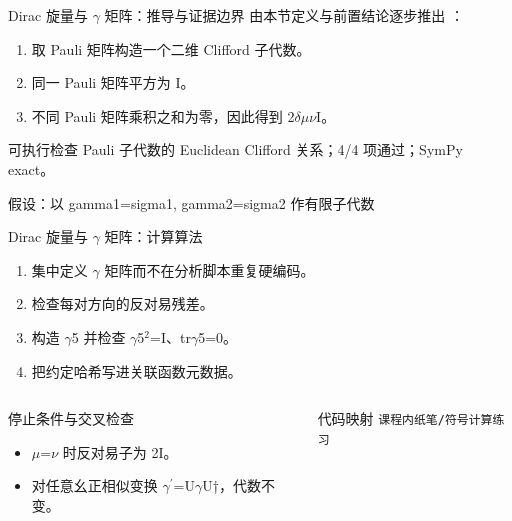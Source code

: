 \begin{frame}[t]{Dirac 旋量与 \ensuremath{\gamma} 矩阵：推导与证据边界}
\footnotesize
{}\quad 由本节定义与前置结论逐步推出 ：
\begin{enumerate}
\item 取 Pauli 矩阵构造一个二维 Clifford 子代数。
\item 同一 Pauli 矩阵平方为 I。
\item 不同 Pauli 矩阵乘积之和为零，因此得到 2\ensuremath{\delta}\ensuremath{\mu}\ensuremath{\nu}I。
\end{enumerate}\begin{block}{可执行检查}
\quad Pauli 子代数的 Euclidean Clifford 关系；4/4 项通过；SymPy exact。
\par\scriptsize 假设：以 gamma1=sigma1, gamma2=sigma2 作有限子代数
\end{block}
\end{frame}

\begin{frame}[t]{Dirac 旋量与 \ensuremath{\gamma} 矩阵：计算算法}
\footnotesize
{}\begin{enumerate}
\item 集中定义 \ensuremath{\gamma} 矩阵而不在分析脚本重复硬编码。
\item 检查每对方向的反对易残差。
\item 构造 \ensuremath{\gamma}5 并检查 \ensuremath{\gamma}5\ensuremath{^{2}}=I、tr\ensuremath{\gamma}5=0。
\item 把约定哈希写进关联函数元数据。
\end{enumerate}\begin{columns}[T,onlytextwidth]
\begin{block}{停止条件与交叉检查}\scriptsize\begin{itemize}
\item[\CheckMark] \ensuremath{\mu}=\ensuremath{\nu} 时反对易子为 2I。
\item[\CheckMark] 对任意幺正相似变换 \ensuremath{\gamma}\ensuremath{^{\prime}}=U\ensuremath{\gamma}U†，代数不变。
\end{itemize}\end{block}
\begin{block}{代码映射}
\scriptsize \texttt{课程内纸笔/\allowbreak{}符号计算练习}
\end{block}\end{columns}\end{frame}


